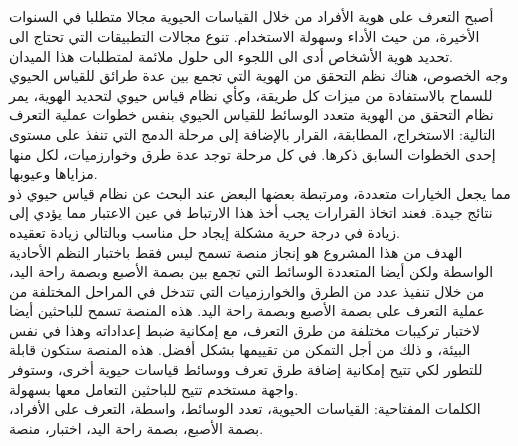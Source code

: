 

 
\begin{otherlanguage}{arabic}

\chapter*{ }


\label{Chapter4} 

 \tab أصبح التعرف على هوية الأفراد من خلال القياسات الحيوية مجالا متطلبا في السنوات الأخيرة، من حيث الأداء وسهولة الاستخدام. تنوع مجالات التطبيقات التي تحتاج الى تحديد هوية الأشخاص أدى الى اللجوء الى حلول ملائمة لمتطلبات هذا الميدان. \\
 وجه الخصوص، هناك نظم التحقق من الهوية التي تجمع بين عدة طرائق للقياس الحيوي للسماح بالاستفادة من ميزات كل طريقة، وكأي نظام قياس حيوي لتحديد الهوية، يمر نظام التحقق من الهوية متعدد الوسائط للقياس الحيوي بنفس خطوات عملية التعرف التالية: الاستخراج، المطابقة، القرار بالإضافة إلى مرحلة الدمج التي تنفذ على مستوى إحدى الخطوات السابق ذكرها. في كل مرحلة توجد عدة طرق وخوارزميات، لكل منها مزاياها وعيوبها.\\
\tab مما يجعل الخيارات متعددة، ومرتبطة بعضها البعض عند البحث عن نظام قياس حيوي ذو نتائج جيدة. فعند اتخاذ القرارات يجب أخذ هذا الارتباط في عين الاعتبار مما يؤدي إلى زيادة في درجة حرية مشكلة إيجاد حل مناسب وبالتالي زيادة تعقيده.\\
\tab الهدف من هذا المشروع هو إنجاز منصة تسمح ليس فقط باختبار النظم الأحادية الواسطة ولكن أيضا المتعددة الوسائط التي تجمع بين بصمة الأصبع وبصمة راحة اليد، من خلال تنفيذ عدد من الطرق والخوارزميات التي تتدخل في المراحل المختلفة من عملية التعرف على بصمة الأصبع وبصمة راحة اليد. هذه المنصة تسمح للباحثين أيضا لاختبار تركيبات مختلفة من طرق التعرف، مع إمكانية ضبط إعداداته وهذا في نفس البيئة، و ذلك من أجل التمكن من تقييمها بشكل أفضل. هذه المنصة ستكون قابلة للتطور لكي تتيح إمكانية إضافة طرق تعرف ووسائط قياسات حيوية أخرى، وستوفر واجهة مستخدم تتيح للباحثين التعامل معها بسهولة. \vspace{10px}\\\tab
الكلمات المفتاحية: القياسات الحيوية، تعدد الوسائط، واسطة، التعرف على الأفراد، بصمة الأصبع، بصمة راحة اليد، اختبار، منصة.

 			
\end{otherlanguage}